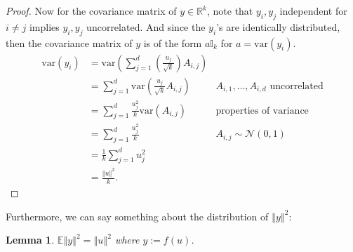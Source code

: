 \documentclass{article}
\newtheorem{lemma}{Lemma}
\begin{document}
\begin{proof}
    Now for the covariance matrix of $y \in \mathbb{R}^k$, note that $y_i, y_j$ independent for $i \neq j$ implies $y_i, y_j$ uncorrelated. And since the $y_i$'s are identically distributed, then the covariance matrix of $y$ is of the form $a\mathbb{I}_k$ for $a = \text{var}(y_i)$.
    \begin{align*}
        \text{var}(y_i) &= \text{var} \left( \sum_{j=1}^d \left(\frac{u_j}{\sqrt{k}} \right) A_{i,j} \right)\\
                        &= \sum_{j=1}^d \text{var} \left(\frac{u_j}{\sqrt{k}}A_{i,j} \right) &\text{$A_{i,1}, \ldots, A_{i,d}$ uncorrelated}\\
                        &= \sum_{j=1}^d \frac{u_j^2}{k} \text{var} \left(A_{i,j} \right) &\text{properties of variance}\\
                        &= \sum_{j=1}^d \frac{u_j^2}{k} &A_{i,j} \sim \mathcal{N}(0,1)\\
                        &= \frac{1}{k} \sum_{j=1}^d u_j^2\\
                        &= \frac{\left \Vert u \right \Vert^2}{k}.
    \end{align*}
    \end{proof}
    
     Furthermore, we can say something about the distribution of $\left\Vert y \right\Vert^2$:
     \begin{lemma}
     $\mathbb{E} \left\Vert y \right\Vert^2 = \left\Vert u \right\Vert^2$ where $y:= f(u)$.
     \end{lemma}
     
\end{document}
